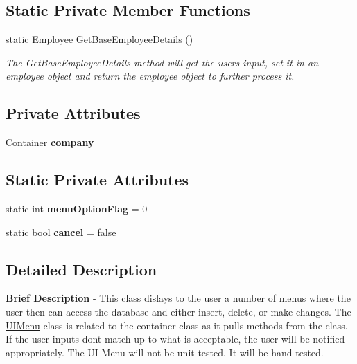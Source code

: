 \subsection*{Static Private Member Functions}
\begin{DoxyCompactItemize}
\item 
static \hyperlink{class_all_employees_1_1_employee}{Employee} \hyperlink{class_presentation_1_1_u_i_menu_a32f1de7167b0ffb469fea1c2714b81a6}{Get\+Base\+Employee\+Details} ()
\begin{DoxyCompactList}\small\item\em The Get\+Base\+Employee\+Details method will get the users input, set it in an employee object and return the employee object to further process it. \end{DoxyCompactList}\end{DoxyCompactItemize}
\subsection*{Private Attributes}
\begin{DoxyCompactItemize}
\item 
\hypertarget{class_presentation_1_1_u_i_menu_ada9168d7b009f78447aa7e748d160585}{}\hyperlink{class_the_company_1_1_container}{Container} {\bfseries company}\label{class_presentation_1_1_u_i_menu_ada9168d7b009f78447aa7e748d160585}

\end{DoxyCompactItemize}
\subsection*{Static Private Attributes}
\begin{DoxyCompactItemize}
\item 
\hypertarget{class_presentation_1_1_u_i_menu_ad4c1bc726554d67c6de3d5641274df38}{}static int {\bfseries menu\+Option\+Flag} = 0\label{class_presentation_1_1_u_i_menu_ad4c1bc726554d67c6de3d5641274df38}

\item 
\hypertarget{class_presentation_1_1_u_i_menu_a766e4091fa9627d73aacc3ca046b5664}{}static bool {\bfseries cancel} = false\label{class_presentation_1_1_u_i_menu_a766e4091fa9627d73aacc3ca046b5664}

\end{DoxyCompactItemize}


\subsection{Detailed Description}
{\bfseries Brief Description} -\/ This class dislays to the user a number of menus where the user then can access the database and either insert, delete, or make changes. The \hyperlink{class_presentation_1_1_u_i_menu}{U\+I\+Menu} class is related to the container class as it pulls methods from the class. If the user inputs don\textquotesingle{}t match up to what is acceptable, the user will be notified appropriately. The U\+I Menu will not be unit tested. It will be hand tested. 


